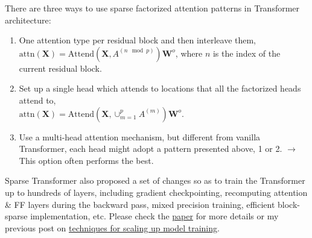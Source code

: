 \documentclass[12pt]{article}
\begin{document}
There are three ways to use sparse factorized attention patterns in Transformer architecture:
\begin{enumerate}
    \item One attention type per residual block and then interleave them, \\
    $\text{attn}(\mathbf{X}) = \text{Attend}(\mathbf{X}, A^{(n \mod p)}) \mathbf{W}^o$, where $n$ is the index of the current residual block.
    \item Set up a single head which attends to locations that all the factorized heads attend to, \\
    $\text{attn}(\mathbf{X}) = \text{Attend}(\mathbf{X}, \cup_{m=1}^p A^{(m)}) \mathbf{W}^o $.
    \item Use a multi-head attention mechanism, but different from vanilla Transformer, each head might adopt a pattern presented above, 1 or 2. $\rightarrow$ This option often performs the best.
\end{enumerate}

Sparse Transformer also proposed a set of changes so as to train the Transformer up to hundreds of layers, including gradient checkpointing, recomputing attention \& FF layers during the backward pass, mixed precision training, efficient block-sparse implementation, etc. Please check the \href{https://arxiv.org/abs/1904.10509}{paper} for more details or my previous post on \href{https://lilianweng.github.io/posts/2021-09-25-train-large/}{techniques for scaling up model training}.
\end{document}
